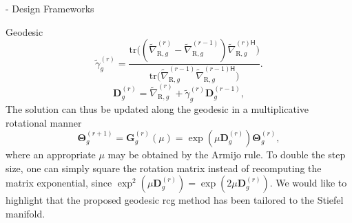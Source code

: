\documentclass[journal]{IEEEtran}
\begin{document}
\begin{section}{- Design Frameworks}
\begin{subsection}{Geodesic }
		\begin{equation}
			\tilde{\gamma}_g^{(r)} = \frac{\mathrm{tr}\bigl((\tilde{\nabla}_{\mathrm{R},g}^{(r)} - \tilde{\nabla}_{\mathrm{R},g}^{(r-1)}) {\tilde{\nabla}_{\mathrm{R},g}^{(r)\mathsf{H}}}\bigr)}{\mathrm{tr}\bigl(\tilde{\nabla}_{\mathrm{R},g}^{(r-1)} {\tilde{\nabla}_{\mathrm{R},g}^{(r-1)\mathsf{H}}}\bigr)}. %
			\label{eq:parameter_cg_geodesic}
		\end{equation}
		\begin{equation}
			{\mathbf{D}}_g^{(r)} = \tilde{\nabla}_{\mathrm{R},g}^{(r)} + \tilde{\gamma}_g^{(r)} {\mathbf{D}}_g^{(r-1)},
			\label{eq:direction_cg_geodesic}
		\end{equation}
		The solution can thus be updated along the geodesic in a multiplicative rotational manner
		\begin{equation}
			\mathbf{\Theta}_g^{(r+1)} = \mathbf{G}_g^{(r)}(\mu) = \exp(\mu \mathbf{D}_g^{(r)}) \mathbf{\Theta}_g^{(r)},
			\label{eq:update_geodesic}
		\end{equation}
		where an appropriate $\mu$ may be obtained by the Armijo rule.
		To double the step size, one can simply square the rotation matrix instead of recomputing the matrix exponential, since $\exp^2(\mu \mathbf{D}_g^{(r)}) = \exp(2 \mu \mathbf{D}_g^{(r)})$.
		We would like to highlight that the proposed geodesic \gls{rcg} method has been tailored to the Stiefel manifold.


\end{subsection}
\end{section}
\end{document}
